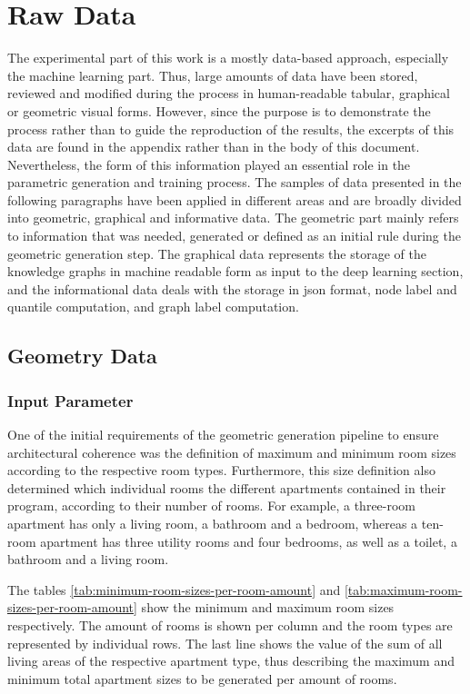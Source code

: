 \documentclass[a4paper, 12pt]{report}
\begin{document}
\chapter{Raw Data}\label{chap:raw-data}

The experimental part of this work is a mostly data-based approach, especially the machine learning part. Thus, large amounts of data have been stored, reviewed and modified during the process in human-readable tabular, graphical or geometric visual forms. However, since the purpose is to demonstrate the process rather than to guide the reproduction of the results, the excerpts of this data are found in the appendix rather than in the body of this document. Nevertheless, the form of this information played an essential role in the parametric generation and training process. The samples of data presented in the following paragraphs have been applied in different areas and are broadly divided into geometric, graphical and informative data. The geometric part mainly refers to information that was needed, generated or defined as an initial rule during the geometric generation step. The graphical data represents the storage of the \glspl{knowledge graph} in machine readable form as input to the deep learning section, and the informational data deals with the storage in \acrshort{json} format, node label and \gls{quantile} computation, and graph label computation.

\section{Geometry Data}\label{sec:geometry-data}

\subsection{Input Parameter}\label{subsec:input-parameter}

One of the initial requirements of the geometric generation pipeline to ensure architectural coherence was the definition of maximum and minimum room sizes according to the respective room types. Furthermore, this size definition also determined which individual rooms the different apartments contained in their program, according to their number of rooms. For example, a three-room apartment has only a living room, a bathroom and a bedroom, whereas a ten-room apartment has three utility rooms and four bedrooms, as well as a toilet, a bathroom and a living room.

The tables \ref{tab:minimum-room-sizes-per-room-amount} and \ref{tab:maximum-room-sizes-per-room-amount} show the minimum and maximum room sizes respectively. The amount of rooms is shown per column and the room types are represented by individual rows. The last line shows the value of the sum of all living areas of the respective apartment type, thus describing the maximum and minimum total apartment sizes to be generated per amount of rooms.
\end{document}
